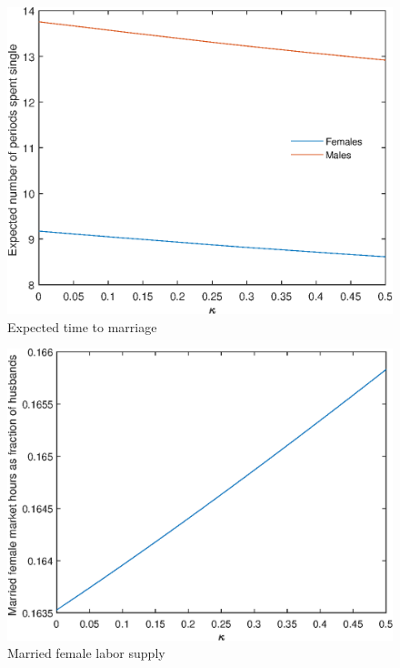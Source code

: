 \documentclass[12pt]{article}
\begin{document}
\begin{figure}
	\centering
	\caption{Expected time to marriage}
	\includegraphics{Graphs/exp_single_kappa_ex1.eps}
\end{figure}

\begin{figure}
	\centering
	\caption{Married female labor supply}
	\includegraphics{Graphs/lf_kappa_ex1.eps}
\end{figure}
\end{document}
